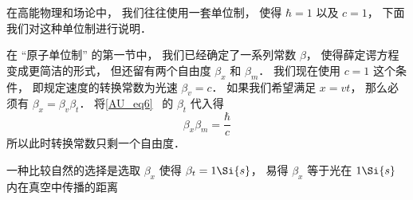 
\begin{issues}
\issueDraft
\end{issues}


在高能物理和场论中， 我们往往使用一套单位制， 使得 $\hbar = 1$ 以及 $c = 1$， 下面我们对这种单位制进行说明．

在 “原子单位制” 的第一节中， 我们已经确定了一系列常数 $\beta$， 使得薛定谔方程变成更简洁的形式， 但还留有两个自由度 $\beta_x$ 和 $\beta_m$． 我们现在使用 $c = 1$ 这个条件， 即规定速度的转换常数为光速 $\beta_v = c$． 如果我们希望满足 $x = vt$， 那么必须有 $\beta_x = \beta_v \beta _t$． 将\autoref{AU_eq6}~ 的 $\beta_t$ 代入得
\begin{equation}
\beta_x \beta_m = \frac{\hbar}{c}
\end{equation}
所以此时转换常数只剩一个自由度．

一种比较自然的选择是选取 $\beta_x$ 使得 $\beta_t = 1\Si{s}$， 易得 $\beta_x$ 等于光在 $1\Si{s}$ 内在真空中传播的距离
